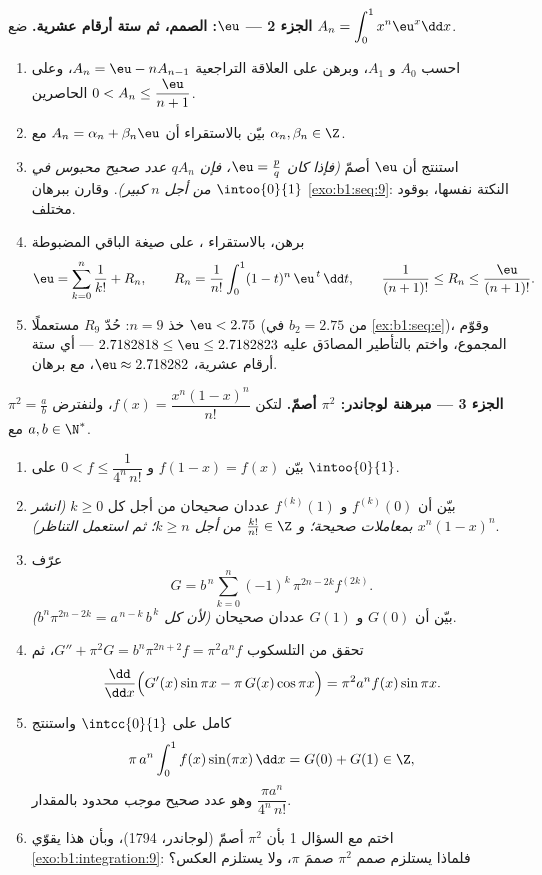 \begin{problem}
\medskip
\noindent\textbf{الجزء 2 --- $\eu$: الصمم، ثم ستة
أرقام عشرية.} ضع $A_n = \displaystyle\int_0^1 x^n \eu^x \dd x$.
\begin{enumerate}[resume]
  \item احسب $A_0$ و $A_1$، وبرهن على العلاقة التراجعية $A_n = \eu
        - n A_{n-1}$، وعلى الحاصرين $0 < A_n \leq
        \dfrac{\eu}{n+1}$.
  \item بيّن بالاستقراء أن $A_n = \alpha_n + \beta_n \eu$
        مع $\alpha_n, \beta_n \in \Z$.
  \item استنتج أن $\eu$ أصمّ \emph{(فإذا كان $\eu = \frac
        pq$، فإن $q A_n$ عدد صحيح محبوس في
        $\intoo{0}{1}$ من أجل $n$ كبير)}. وقارن ببرهان
        \cref{exo:b1:seq:9}: النكتة نفسها، بوقود مختلف.
  \item برهن، بالاستقراء ، على صيغة
        الباقي المضبوطة
        \[
        \eu = \sum_{k=0}^{n} \frac{1}{k!} + R_n,
        \qquad
        R_n = \frac{1}{n!}\int_0^1 (1 - t)^n\,\eu^{\,t}\,\dd t,
        \qquad
        \frac{1}{(n+1)!} \leq R_n \leq \frac{\eu}{(n+1)!} .
        \]
  \item خذ $n = 9$: حُدّ $R_9$ مستعملًا $\eu < 2.75$ (من
        $b_2 = 2.75$ في \cref{ex:b1:seq:e})، وقوّم المجموع،
        واختم بالتأطير المصادَق عليه $2.7182818 \leq
        \eu \leq 2.7182823$ --- أي ستة أرقام عشرية، $\eu \approx
        2.718282$، مع برهان.
\end{enumerate}

\medskip
\noindent\textbf{الجزء 3 --- مبرهنة لوجاندر: $\pi^2$
أصمّ.} لتكن $f(x) = \dfrac{x^n (1 - x)^n}{n!}$، ولنفترض
$\pi^2 = \frac ab$ مع $a, b \in \N^*$.
\begin{enumerate}[resume]
  \item بيّن $f(1 - x) = f(x)$ و $0 < f \leq
        \dfrac{1}{4^n\,n!}$ على $\intoo{0}{1}$.
  \item بيّن أن $f^{(k)}(0)$ و $f^{(k)}(1)$ عددان صحيحان من أجل
        كل $k \geq 0$ \emph{(انشر $x^n(1-x)^n$ بمعاملات
        صحيحة؛ و $\frac{k!}{n!} \in \Z$ من أجل $k \geq n$؛
        ثم استعمل التناظر)}.
  \item عرّف
        \[
        G = b^{\,n} \sum_{k=0}^{n} (-1)^k\,
        \pi^{2n - 2k} f^{(2k)} .
        \]
        بيّن أن $G(0)$ و $G(1)$ عددان صحيحان \emph{(لأن كل
        $b^n \pi^{2n-2k} = a^{\,n-k}\,b^{\,k}$)}.
  \item تحقق من التلسكوب $G'' + \pi^2 G = b^n \pi^{2n+2} f
        = \pi^2 a^n f$، ثم
        \[
        \frac{\dd}{\dd x}\Bigl(G'(x)\sin \pi x - \pi\,G(x)\cos
        \pi x\Bigr) = \pi^2 a^n f(x)\sin \pi x .
        \]
  \item كامل على $\intcc{0}{1}$ واستنتج
        \[
        \pi\,a^n \int_0^1 f(x)\sin(\pi x)\,\dd x = G(0) + G(1)
        \in \Z ,
        \]
        وهو عدد صحيح \emph{موجب} محدود بالمقدار $\dfrac{\pi
        a^n}{4^n\,n!}$.
  \item اختم مع السؤال 1 بأن $\pi^2$ أصمّ
        (لوجاندر، 1794)، وبأن هذا يقوّي
        \cref{exo:b1:integration:9}: فلماذا يستلزم صمم
        $\pi^2$ صممَ $\pi$، ولا يستلزم العكس؟
\end{enumerate}


\end{problem}
